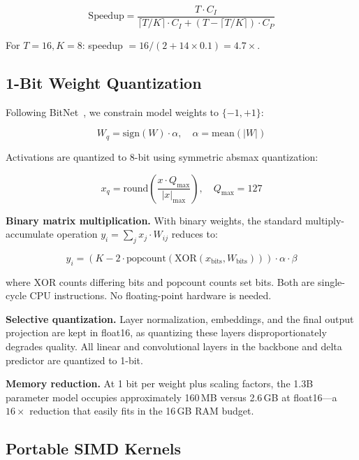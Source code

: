 \documentclass[11pt]{article}
\begin{document}
\begin{equation}
  \text{Speedup} = \frac{T \cdot C_I}{\lceil T/K \rceil \cdot C_I + (T - \lceil T/K \rceil) \cdot C_P}
\end{equation}

For $T=16, K=8$: speedup $= 16 / (2 + 14 \times 0.1) = 4.7\times$.

\subsection{1-Bit Weight Quantization}
\label{sec:bitnet}

Following BitNet~\citep{wang2023bitnet}, we constrain model weights to $\{-1, +1\}$:

\begin{equation}
  W_q = \text{sign}(W) \cdot \alpha, \quad \alpha = \text{mean}(|W|)
\end{equation}

Activations are quantized to 8-bit using symmetric absmax quantization:

\begin{equation}
  x_q = \text{round}\!\left(\frac{x \cdot Q_{\max}}{|x|_{\max}}\right), \quad Q_{\max} = 127
\end{equation}

\textbf{Binary matrix multiplication.} With binary weights, the standard multiply-accumulate operation $y_i = \sum_j x_j \cdot W_{ij}$ reduces to:

\begin{equation}
  y_i = \left(K - 2 \cdot \text{popcount}(\text{XOR}(x_{\text{bits}}, W_{\text{bits}}))\right) \cdot \alpha \cdot \beta
\end{equation}

where $\text{XOR}$ counts differing bits and $\text{popcount}$ counts set bits. Both are single-cycle CPU instructions. No floating-point hardware is needed.

\textbf{Selective quantization.} Layer normalization, embeddings, and the final output projection are kept in float16, as quantizing these layers disproportionately degrades quality. All linear and convolutional layers in the backbone and delta predictor are quantized to 1-bit.

\textbf{Memory reduction.} At 1 bit per weight plus scaling factors, the 1.3B parameter model occupies approximately 160\,MB versus 2.6\,GB at float16---a $16\times$ reduction that easily fits in the 16\,GB RAM budget.

\subsection{Portable SIMD Kernels}
\label{sec:avx2}
\end{document}
